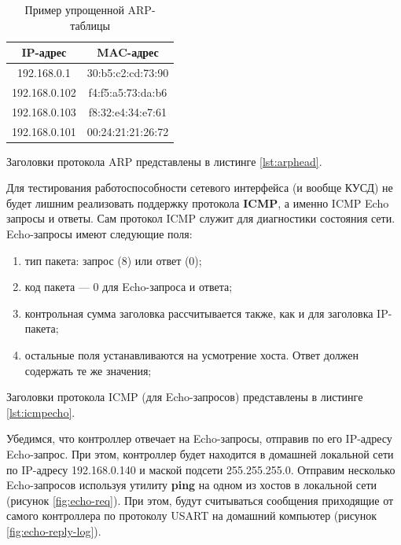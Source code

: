 \begin{table}[h!]
\caption{Пример упрощенной ARP-таблицы}
\label{arptable}
	\begin{tabular}{|c|c|}
	\hline
	IP-адрес & MAC-адрес\\
	\hline
	192.168.0.1 & 30:b5:c2:cd:73:90 \\
	\hline
	192.168.0.102 & f4:f5:a5:73:da:b6 \\
	\hline
	192.168.0.103 & f8:32:e4:34:e7:61 \\
	\hline
	192.168.0.101 & 00:24:21:21:26:72 \\
	\hline
	\end{tabular}
\end{table}

Заголовки протокола ARP представлены в листинге \ref{lst:arphead}.

{\small{}}

Для тестирования работоспособности сетевого интерфейса (и вообще КУСД) не будет лишним реализовать поддержку протокола \textbf{ICMP}, а именно ICMP Echo запросы и ответы. Сам протокол ICMP служит для диагностики состояния сети. Echo-запросы имеют следующие поля:
\begin{enumerate}
	\item тип пакета: запрос (8) или ответ (0);
	\item код пакета --- 0 для Echo-запроса и ответа;
	\item контрольная сумма заголовка рассчитывается также, как и для заголовка IP-пакета;
	\item остальные поля устанавливаются на усмотрение хоста. Ответ должен содержать те же значения;
\end{enumerate}

Заголовки протокола ICMP (для Echo-запросов) представлены в листинге \ref{lst:icmpecho}.

{\small{}}

Убедимся, что контроллер отвечает на Echo-запросы, отправив по его IP-адресу Echo-запрос. При этом, контроллер будет находится в домашней локальной сети по IP-адресу 192.168.0.140 и маской подсети 255.255.255.0. Отправим несколько Echo-запросов используя утилиту \textbf{ping} на одном из хостов в локальной сети (рисунок \ref{fig:echo-req}). При этом, будут считываться сообщения приходящие от самого контроллера по протоколу USART на домашний компьютер (рисунок \ref{fig:echo-reply-log}).

